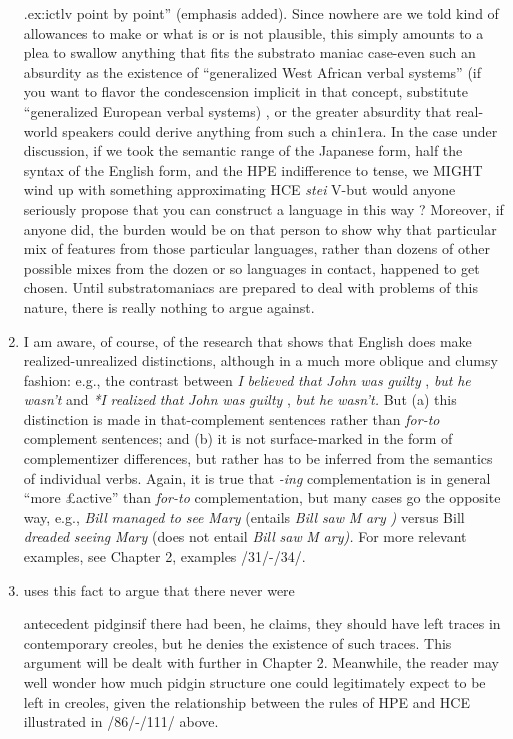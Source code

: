 \begin{enumerate}
.ex:ictlv point by point'' (emphasis added). Since nowhere are we told kind of allowances to make or what is or is not plausible, this simply amounts to a plea to swallow anything that fits the substrato%
maniac case{}-even such an absurdity as the existence of ``generalized West African verbal systems'' (if you want to flavor the condescension implicit in that concept, substitute ``generalized European verbal systems{\textquotedbl}) , or the greater absurdity that real-world speakers could derive anything from such a chin1era. In the case under discussion, if we took the semantic range of the Japanese form, half the syntax of the English form, and the HPE indifference to tense, we MIGHT wind up with something approximating HCE \textit{stei} V{}-but would anyone seriously propose that you can construct a language in this way ? Moreover, if anyone did, the burden would be on that person to show why that particular mix of features from those particular languages, rather than dozens of other possible mixes from the dozen or so lan\-guages in contact, happened to get chosen. Until substratomaniacs are prepared to deal with problems of this nature, there is really nothing
to argue against.
 
\item I am aware, of course, of the research that shows that English 
does make realized-unrealized distinctions, although in a much more oblique and clumsy fashion: e.g., the contrast between \textit{I} \textit{believed} \textit{that} \textit{John} \textit{was} \textit{guilty} , \textit{but} \textit{he} \textit{wasn't} and \textit{*I} \textit{realized} \textit{that} \textit{John} \textit{was} \textit{guilty} , \textit{but} \textit{he} \textit{wasn't.} But (a) this distinction is made in that-complement sentences rather than \textit{for-to} complement sentences; and (b) it is not surface-marked in the form of complementizer differences, but rather has to be inferred from the semantics of individual verbs. Again, it is true that \textit{{}-i}\textit{n}\textit{g} complementation is in general ``more £active'' than \textit{for-to} complementation, but many cases go the opposite way, e.g., \textit{Bill} \textit{managed} \textit{to} \textit{see} \textit{Mary} (entails \textit{Bill} \textit{saw} \textit{M} \textit{ary} \textit{)} versus Bill \textit{dreaded} \textit{seeing} \textit{Mary} (does not entail \textit{Bill} \textit{saw} \textit{M} \textit{ary).} For more relevant exam\-ples, see Chapter 2, examples /31/-/34/.
 
\item \citet{Alleyne1979} uses this fact to argue that there never were 

antecedent pidginsif there had been, he claims, they should have left traces in contemporary creoles, but he denies the existence of such traces. This argument will be dealt with further in Chapter 2. Meanwhile, the reader may well wonder how much pidgin structure one could legitimately expect to be left in creoles, given the relation\-ship between the rules of HPE and HCE illustrated in /86/-/111/ above.

\end{enumerate}

